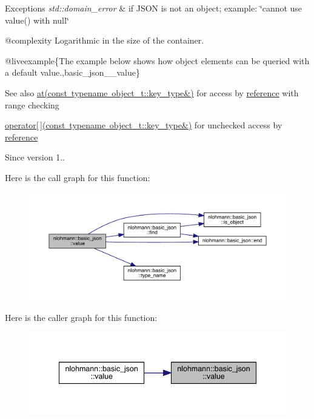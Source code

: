 \begin{DoxyExceptions}{Exceptions}
{\em std\+::domain\+\_\+error} & if J\+S\+ON is not an object; example\+: {\ttfamily \char`\"{}cannot use
value() with null\char`\"{}}\\
\hline
\end{DoxyExceptions}
@complexity Logarithmic in the size of the container.

@liveexample\{The example below shows how object elements can be queried with a default value.,basic\+\_\+json\+\_\+\+\_\+value\}

\begin{DoxySeeAlso}{See also}
\mbox{\hyperlink{classnlohmann_1_1basic__json_a93403e803947b86f4da2d1fb3345cf2c}{at(const typename object\+\_\+t\+::key\+\_\+type\&)}} for access by \mbox{\hyperlink{classnlohmann_1_1basic__json_ac6a5eddd156c776ac75ff54cfe54a5bc}{reference}} with range checking 

\mbox{\hyperlink{classnlohmann_1_1basic__json_a233b02b0839ef798942dd46157cc0fe6}{operator\mbox{[}$\,$\mbox{]}(const typename object\+\_\+t\+::key\+\_\+type\&)}} for unchecked access by \mbox{\hyperlink{classnlohmann_1_1basic__json_ac6a5eddd156c776ac75ff54cfe54a5bc}{reference}}
\end{DoxySeeAlso}
\begin{DoxySince}{Since}
version 1.. 
\end{DoxySince}
Here is the call graph for this function\+:\nopagebreak
\begin{figure}[H]
\begin{center}
\leavevmode
\includegraphics[width=350pt]{classnlohmann_1_1basic__json_af9c51328fbe1da75eca750be3009917a_cgraph}
\end{center}
\end{figure}
Here is the caller graph for this function\+:\nopagebreak
\begin{figure}[H]
\begin{center}
\leavevmode
\includegraphics[width=341pt]{classnlohmann_1_1basic__json_af9c51328fbe1da75eca750be3009917a_icgraph}
\end{center}
\end{figure}
